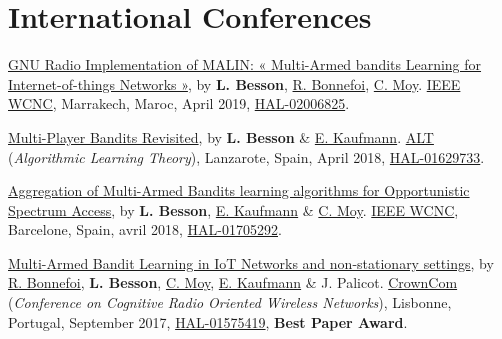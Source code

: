 \section*{International Conferences}
\renewcommand{\labelenumi}{[IC-\arabic{enumi}]}
\begin{etaremune}
\item
  \href{https://perso.crans.org/besson/articles/BBM__IEEE_WCNC_2019.pdf}{GNU
  Radio Implementation of MALIN: « Multi-Armed bandits Learning for
  Internet-of-things Networks »}, by \textbf{L. Besson},
  \href{https://remibonnefoi.wordpress.com/}{R. Bonnefoi},
  \href{https://moychris.wordpress.com/}{C. Moy}.
  \href{http://wcnc2019.ieee-wcnc.org/}{IEEE WCNC},
  Marrakech, Maroc, April 2019, \href{https://hal.inria.fr/hal-02006825}{HAL-02006825}.
  \cite{Besson2019WCNC}
\item
  \href{https://hal.inria.fr/hal-01629733/document}{Multi-Player Bandits
  Revisited}, by \textbf{L. Besson} \&
  \href{http://chercheurs.lille.inria.fr/ekaufman/research.html}{E.
  Kaufmann}.
  \href{http://www.cs.cornell.edu/conferences/alt2018/accepted.html}{ALT}
  (\emph{Algorithmic Learning Theory}), Lanzarote, Spain, April 2018,
  \href{https://hal.inria.fr/hal-01629733}{HAL-01629733}.
  \cite{Besson2018ALT}
\item
  \href{https://hal.inria.fr/hal-01705292/document}{Aggregation of
  Multi-Armed Bandits learning algorithms for Opportunistic Spectrum
  Access}, by \textbf{L. Besson},
  \href{http://chercheurs.lille.inria.fr/ekaufman/research.html}{E.
  Kaufmann} \& \href{https://moychris.wordpress.com/}{C. Moy}.
  \href{http://wcnc2018.ieee-wcnc.org/}{IEEE WCNC}, Barcelone, Spain,
  avril 2018, \href{https://hal.inria.fr/hal-01705292}{HAL-01705292}.
  \cite{Besson2018WCNC}
\item
  \href{https://hal.inria.fr/hal-01575419/document}{Multi-Armed Bandit
  Learning in IoT Networks and non-stationary settings}, by
  \href{https://remibonnefoi.wordpress.com/}{R. Bonnefoi}, \textbf{L.
  Besson}, \href{https://moychris.wordpress.com/}{C. Moy},
  \href{http://chercheurs.lille.inria.fr/ekaufman/research.html}{E.
  Kaufmann} \& J. Palicot. \href{http://crowncom.org/2017/}{CrownCom}
  (\emph{Conference on Cognitive Radio Oriented Wireless Networks}),
  Lisbonne, Portugal, September 2017,
  \href{https://hal.inria.fr/hal-01575419}{HAL-01575419}, \textbf{Best Paper Award}.
  \cite{Bonnefoi17}
\end{etaremune}




